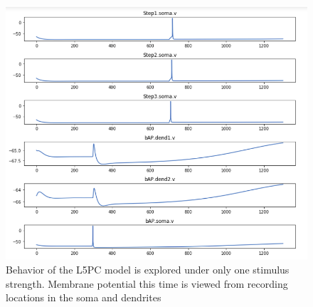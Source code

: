 \begin{figure}
    \begin{center}
    \includegraphics{figures/l5pc}
    \caption[Behavior of the L5PC model under optimized parameters]{Behavior of the L5PC model is explored under only one stimulus strength. Membrane potential this time is viewed from recording locations in the soma and dendrites}
    \label{fig:after_optimization}
    \end{center}
\end{figure}

